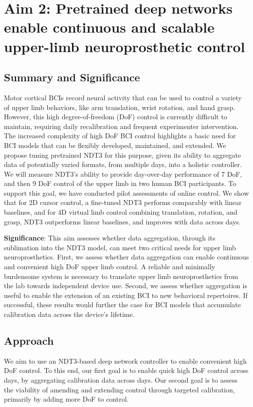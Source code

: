\documentclass[12pt,oneside]{report}
\begin{document}
\chapter{Aim 2: Pretrained deep networks enable continuous and scalable upper-limb neuroprosthetic control}

\section{Summary and Significance}
Motor cortical BCIs record neural activity that can be used to control a variety of upper limb behaviors, like arm translation, wrist rotation, and hand grasp.
However, this high degree-of-freedom (DoF) control is currently difficult to maintain, requiring daily recalibration and frequent experimenter intervention.
The increased complexity of high DoF BCI control highlights a basic need for BCI models that can be flexibly developed, maintained, and extended.
We propose tuning pretrained NDT3 for this purpose, given its ability to aggregate data of potentially varied formats, from multiple days, into a holistic controller. We will measure NDT3's ability to provide day-over-day performance of 7 DoF, and then 9 DoF control of the upper limb in two human BCI participants. To support this goal, we have conducted pilot assessments of online control. We show that for 2D cursor control, a fine-tuned NDT3 performs comparably with linear baselines, and for 4D virtual limb control combining translation, rotation, and grasp, NDT3 outperforms linear baselines, and improves with data across days.

\textbf{Significance}: This aim assesses whether data aggregation, through its sublimation into the NDT3 model, can meet two critical needs for upper limb neuroprosthetics. First, we assess whether data aggregation can enable continuous and convenient high DoF upper limb control. A reliable and minimally burdensome system is necessary to translate upper limb neuroprosthetics from the lab towards independent device use. Second, we assess whether aggregation is useful to enable the extension of an existing BCI to new behavioral repertoires. If successful, these results would further the case for BCI models that accumulate calibration data across the device's lifetime.

\section{Approach}
We aim to use an NDT3-based deep network controller to enable convenient high DoF control. To this end, our first goal is to enable quick high DoF control across days, by aggregating calibration data across days. Our second goal is to assess the viability of amending and extending control through targeted calibration, primarily by adding more DoF to control.
\end{document}
